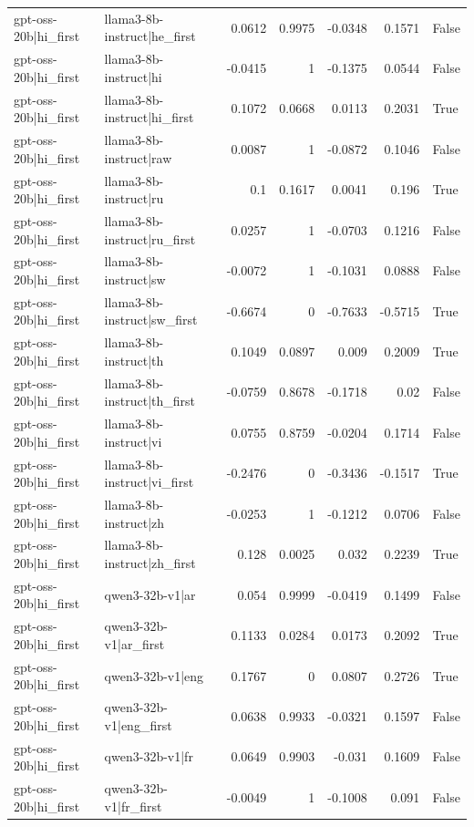 \begin{table}
\begin{tabular}{l l r r r r l}
gpt-oss-20b|hi_first & llama3-8b-instruct|he_first & 0.0612 & 0.9975 & -0.0348 & 0.1571 & False \\
gpt-oss-20b|hi_first & llama3-8b-instruct|hi & -0.0415 & 1 & -0.1375 & 0.0544 & False \\
gpt-oss-20b|hi_first & llama3-8b-instruct|hi_first & 0.1072 & 0.0668 & 0.0113 & 0.2031 & True \\
gpt-oss-20b|hi_first & llama3-8b-instruct|raw & 0.0087 & 1 & -0.0872 & 0.1046 & False \\
gpt-oss-20b|hi_first & llama3-8b-instruct|ru & 0.1 & 0.1617 & 0.0041 & 0.196 & True \\
gpt-oss-20b|hi_first & llama3-8b-instruct|ru_first & 0.0257 & 1 & -0.0703 & 0.1216 & False \\
gpt-oss-20b|hi_first & llama3-8b-instruct|sw & -0.0072 & 1 & -0.1031 & 0.0888 & False \\
gpt-oss-20b|hi_first & llama3-8b-instruct|sw_first & -0.6674 & 0 & -0.7633 & -0.5715 & True \\
gpt-oss-20b|hi_first & llama3-8b-instruct|th & 0.1049 & 0.0897 & 0.009 & 0.2009 & True \\
gpt-oss-20b|hi_first & llama3-8b-instruct|th_first & -0.0759 & 0.8678 & -0.1718 & 0.02 & False \\
gpt-oss-20b|hi_first & llama3-8b-instruct|vi & 0.0755 & 0.8759 & -0.0204 & 0.1714 & False \\
gpt-oss-20b|hi_first & llama3-8b-instruct|vi_first & -0.2476 & 0 & -0.3436 & -0.1517 & True \\
gpt-oss-20b|hi_first & llama3-8b-instruct|zh & -0.0253 & 1 & -0.1212 & 0.0706 & False \\
gpt-oss-20b|hi_first & llama3-8b-instruct|zh_first & 0.128 & 0.0025 & 0.032 & 0.2239 & True \\
gpt-oss-20b|hi_first & qwen3-32b-v1|ar & 0.054 & 0.9999 & -0.0419 & 0.1499 & False \\
gpt-oss-20b|hi_first & qwen3-32b-v1|ar_first & 0.1133 & 0.0284 & 0.0173 & 0.2092 & True \\
gpt-oss-20b|hi_first & qwen3-32b-v1|eng & 0.1767 & 0 & 0.0807 & 0.2726 & True \\
gpt-oss-20b|hi_first & qwen3-32b-v1|eng_first & 0.0638 & 0.9933 & -0.0321 & 0.1597 & False \\
gpt-oss-20b|hi_first & qwen3-32b-v1|fr & 0.0649 & 0.9903 & -0.031 & 0.1609 & False \\
gpt-oss-20b|hi_first & qwen3-32b-v1|fr_first & -0.0049 & 1 & -0.1008 & 0.091 & False \\

\end{tabular}
\end{table}
